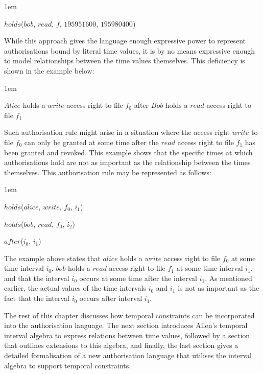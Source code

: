 \documentclass[11pt]{report}
\newenvironment{vquote}
{
  \begin{list}{}{\leftmargin 1em}\item[]
}
{
  \end{list}
}
\begin{document}
      \begin{vquote}
        $holds$($bob$, $read$, $f$, $195951600$, $195980400$)
      \end{vquote}

      While this approach gives the language enough expressive power to
      represent authorisations bound by literal time values, it is by no means
      expressive enough to model relationships between the time values
      themselves. This deficiency is shown in the example below:

      \begin{vquote}
        $Alice$ holds a $write$ access right to file $f_0$ after $Bob$ holds a
        $read$ access right to file $f_1$
      \end{vquote}

      Such authorisation rule might arise in a situation where the access right
      $write$ to file $f_0$ can only be granted at some time after the $read$
      access right to file $f_1$ has been granted and revoked. This example
      shows that the specific times at which authorisations hold are not as
      important as the relationship between the times themselves. This
      authorisation rule may be represented as follows:

      \begin{vquote}
        $holds$($alice$, $write$, $f_0$, $i_{1}$)

        $holds$($bob$, $read$, $f_0$, $i_{2}$)

        $after$($i_0$, $i_1$)
      \end{vquote}

      The example above states that $alice$ holds a $write$ access right to
      file $f_0$ at some time interval $i_0$, $bob$ holds a $read$ access right
      to file $f_1$ at some time interval $i_1$, and that the interval $i_0$
      occurs at some time after the interval $i_1$. As mentioned earlier, the
      actual values of the time intervals $i_0$ and $i_1$ is not as important
      as the fact that the interval $i_0$ occurs after interval $i_1$.

      The rest of this chapter discusses how temporal constraints can be
      incorporated into the authorisation language. The next section introduces
      Allen's temporal interval algebra to express relations between time
      values, followed by a section that outlines extensions to this algebra,
      and finally, the last section gives a detailed formalisation of a new
      authorisation language that utilises the interval algebra to support
      temporal constraints.
\end{document}
